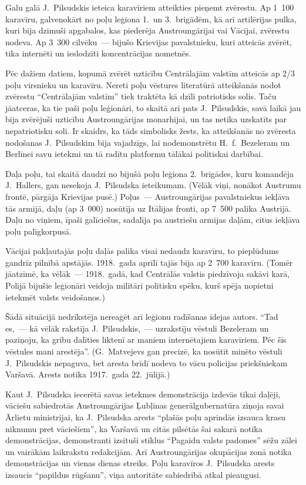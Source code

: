 \documentclass[twoside,a5paper,12pt,fleqn,openany]{extbook}
\begin{document}
Galu galā J.~Pilsudskis ieteica karavīriem atteikties pieņemt zvērestu. Ap 1~100 karavīru, galvenokārt no poļu leģiona 1.~un 3.~brigādēm, kā arī artilērijas pulka, kuri bija dzimuši apgabalos, kas piederēja Austroungārijai vai Vācijai, zvērestu nodeva. Ap 3~300 cilvēku~--- bijušo Krievijas pavalstnieku, kuri atteicās zvērēt, tika internēti un ieslodzīti koncentrācijas nometnēs.

Pēc dažiem datiem, kopumā zvērēt uzticību Centrālajām valstīm atteicās ap 2/3 poļu virsnieku un karavīru. Nereti poļu vēstures literatūrā atteikšanās nodot zvērestu ``Centrālajām valstīm'' tiek traktēta kā dzīli patriotisks solis. Taču jāatceras, ka tie paši poļu leģionāri, to skaitā arī pats J.~Pilsudskis, savā laikā jau bija zvērējuši uzticību Austroungārijas monarhijai, un tas netika uzskatīts par nepatriotisku soli. Ir skaidrs, ka tāds simbolisks žests, ka atteikšanās no zvēresta nodošanas J.~Pilsudskim bija vajadzīgs, lai nodemonstrētu H.~f.~Bezeleram un Berlīnei savu ietekmi un tā radītu platformu tālākai politiskai darbībai.

Daļa poļu, tai skaitā daudzi no bijušā poļu leģiona 2.~brigādes, kuru komandēja J.~Hallers, gan nesekoja J.~Pilsudska ieteikumam. (Vēlāk viņi, nonākot Austrumu frontē, pārgāja Krievijas pusē.) Poļus~--- Austroungārijas pavalstniekus iekļāva tās armijā, daļu (ap 3~000) nosūtīja uz Itālijas fronti, ap 7~500 palika Austrijā. Daļu no viņiem, īpaši galīciešus, sadalīja pa austriešu armijas daļām, citus iekļāva poļu palīgkorpusā.

Vācijai pakļautajās poļu daļās palika visai nedaudz karavīru, to pieplūdums gandrīz pilnībā apstājās. 1918.~gada aprīlī tajās bija ap 2~700 karavīru. (Tomēr jāatzīmē, ka vēlāk~--- 1918.~gadā, kad Centrālās valstis piedzīvoja sakāvi karā, Polijā bijušie leģionāri veidoja militāri politisku spēku, kurš spēja nopietni ietekmēt valsts veidošanos.)

Šādā situācijā nedrīkstēja nereaģēt arī leģionu radīšanas idejas autors. ``Tad es,~--- kā vēlāk rakstīja J.~Pilsudskis,~--- uzrakstīju vēstuli Bezeleram un paziņoju, ka gribu dalīties liktenī ar maniem internētajiem karavīriem. Pēc šīs vēstules mani arestēja''. (G.~Matvejevs gan precizē, ka nosūtīt minēto vēstuli J.~Pilsudskis nepaguva, bet aresta brīdī nodeva to vācu policijas priekšniekam Varšavā. Arests notika 1917.~gada 22.~jūlijā.)

Kaut J.~Pilsudska iecerētā savas ietekmes demonstrācija izdevās tikai daļēji, vāciešu sabiedrotās Austroungārijas Ļubļinas ģenerālgubernatūra ziņoja savai Ārlietu ministrijai, ka J.~Pilsudska arests ``plašās poļu aprindās izsauca krasu niknumu pret vāciešiem'', ka Varšavā un citās pilsētās šai sakarā notika demonstrācijas, demonstranti izsituši stiklus ``Pagaidu valsts padomes'' sēžu zālei un vairākām laikrakstu redakcijām. Arī Austroungārijas okupācijas zonā notika demonstrācijas un vienas dienas streiks. Poļu karavīros J.~Pilsudska arests izsaucis ``papildus rūgšanu'', viņa autoritāte sabiedrībā atkal pieaugusi.
\end{document}
